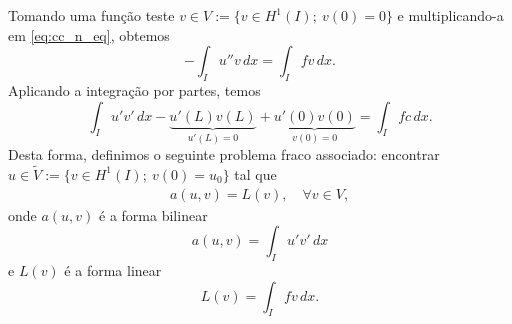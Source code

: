 Tomando uma função teste $v\in V:=\{v\in H^1(I);~v(0)=0\}$ e multiplicando-a em \eqref{eq:cc_n_eq}, obtemos
\begin{equation}
  - \int_I u''v\,dx = \int_I fv\,dx.
\end{equation}
Aplicando a integração por partes, temos
\begin{equation}
  \int_I u'v'\,dx - \underbrace{u'(L)v(L)}_{u'(L)=0} + \underbrace{u'(0)v(0)}_{v(0)=0} = \int_I fc\,dx.
\end{equation}
Desta forma, definimos o seguinte problema fraco associado: encontrar $u\in \tilde{V} := \{v\in H^1(I);~v(0)=u_0\}$ tal que
\begin{align}
  a(u,v) = L(v),\quad\forall v\in V,
\end{align}
onde $a(u,v)$ é a forma bilinear
\begin{equation}\label{eq:cc_n_bilinear}
  a(u,v) = \int_I u'v'\,dx
\end{equation}
e $L(v)$ é a forma linear
\begin{equation}\label{eq:cc_n_linear}
  L(v) = \int_I fv\,dx.
\end{equation}

